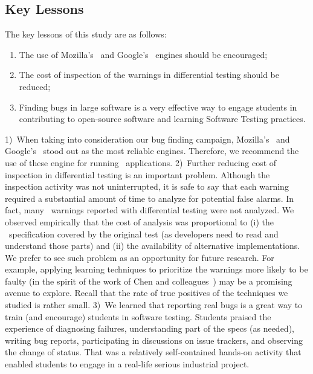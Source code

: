 \documentclass[smallextended]{svjour3}
\begin{document}
\subsection{Key Lessons}
\label{sec:lessons}

The key lessons of this study are as follows:

\begin{enumerate}
\item The use of Mozilla's \smonkey\ and Google's \veight\ engines
  should be encouraged;
\item The cost of inspection of the warnings in differential testing
  should be reduced;
\item Finding bugs in large software is a very effective way to engage
  students in contributing to open-source software and learning
  Software Testing practices.
\end{enumerate}

1)~When taking into consideration our bug finding campaign, Mozilla's
\smonkey\ and Google's \veight\ stood out as the most reliable
engines. Therefore, we recommend the use of these engine for running
\js\ applications. 2)~Further reducing cost of inspection in
differential testing is an important problem. Although the inspection
activity was not uninterrupted, it is safe to say that each warning
required a substantial amount of time to analyze for potential false
alarms. In fact, many \hi\ warnings reported with differential testing
were not analyzed. We observed empirically that the cost of analysis
was proportional to (i) the \js\ specification covered by the original
test (as developers need to read and understand those parts) and (ii)
the availability of alternative implementations. We prefer to see such
problem as an opportunity for future research. For example, applying
learning techniques to prioritize the warnings more likely to be
faulty (in the spirit of the work of Chen and
colleagues~\cite{Chen:2017:LPT:3097368.3097451}) may be a promising
avenue to explore. Recall that the rate of true positives of the
techniques we studied is rather small. 3)~We learned that reporting
real bugs is a great way to train (and encourage) students in software
testing. Students praised the experience of diagnosing failures,
understanding part of the specs (as needed), writing bug reports,
participating in discussions on issue trackers, and observing the
change of status. That was a relatively self-contained hands-on
activity that enabled students to engage in a real-life serious
industrial project.
\end{document}
